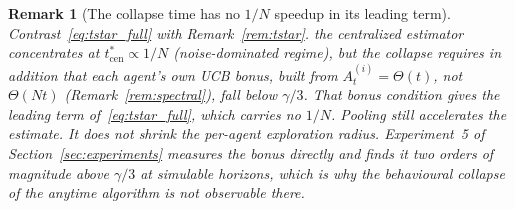 \documentclass[11pt]{article}
\newtheorem{remark}[theorem]{Remark}
\begin{document}
\begin{remark}[The collapse time has no $1/N$ speedup in
its leading term]\label{rem:noN}
Contrast~\eqref{eq:tstar_full} with Remark~\ref{rem:tstar}. the
\emph{centralized estimator} concentrates at $t_{\mathrm{cen}}^*\propto
1/N$ (noise-dominated regime), but the \emph{collapse} requires in
addition that each agent's own UCB bonus, built from
$A_t^{(i)}=\Theta(t)$, \emph{not} $\Theta(Nt)$
(Remark~\ref{rem:spectral}), fall below $\gamma/3$.  That bonus
condition gives the leading term of~\eqref{eq:tstar_full}, which
carries \emph{no} $1/N$.  Pooling still accelerates the
\emph{estimate}. It does not shrink the per-agent exploration radius.
Experiment~5 of Section~\ref{sec:experiments} measures the bonus
directly and finds it two orders of magnitude above $\gamma/3$ at
simulable horizons, which is why the behavioural collapse of the
anytime algorithm is not observable there.
\end{remark}
\end{document}
